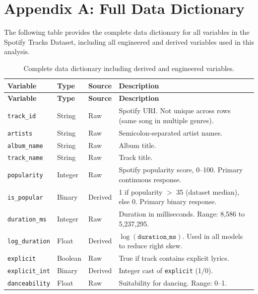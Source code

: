 \documentclass[12pt, oneside]{book}
\begin{document}
\chapter*{Appendix A: Full Data Dictionary}
 
The following table provides the complete data dictionary for all variables in the Spotify Tracks Dataset, including all engineered and derived variables used in this analysis.
 
\begin{longtable}{p{3.2cm} p{1.6cm} p{2.0cm} p{7.5cm}}
\caption{Complete data dictionary including derived and engineered variables.}
\label{tab:appendix_dict} \\
\toprule
\textbf{Variable} & \textbf{Type} & \textbf{Source} & \textbf{Description} \\
\midrule
\endfirsthead
\toprule
\textbf{Variable} & \textbf{Type} & \textbf{Source} & \textbf{Description} \\
\midrule
\endhead
\bottomrule
\endfoot
\texttt{track\_id}         & String  & Raw     & Spotify URI. Not unique across rows (same song in multiple genres). \\
\texttt{artists}           & String  & Raw     & Semicolon-separated artist names. \\
\texttt{album\_name}       & String  & Raw     & Album title. \\
\texttt{track\_name}       & String  & Raw     & Track title. \\
\texttt{popularity}        & Integer & Raw     & Spotify popularity score, 0--100. Primary continuous response. \\
\texttt{is\_popular}       & Binary  & Derived & 1 if popularity $>$ 35 (dataset median), else 0. Primary binary response. \\
\texttt{duration\_ms}      & Integer & Raw     & Duration in milliseconds. Range: 8{,}586 to 5{,}237{,}295. \\
\texttt{log\_duration}     & Float   & Derived & $\log(\texttt{duration\_ms})$. Used in all models to reduce right skew. \\
\texttt{explicit}          & Boolean & Raw     & True if track contains explicit lyrics. \\
\texttt{explicit\_int}     & Binary  & Derived & Integer cast of \texttt{explicit} (1/0). \\
\texttt{danceability}      & Float   & Raw     & Suitability for dancing. Range: 0--1. \\

\end{longtable}
\end{document}
